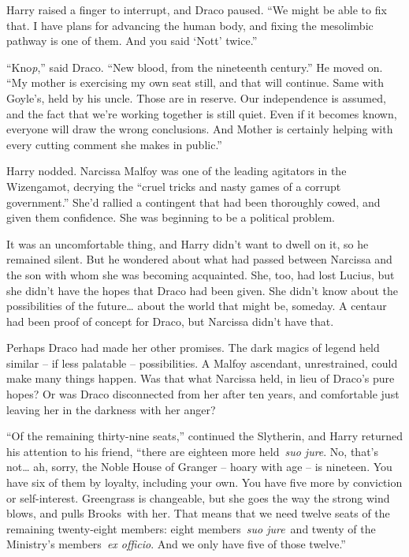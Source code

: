 Harry raised a finger to interrupt, and Draco paused. ``We might be able
to fix that. I have plans for advancing the human body, and fixing the
mesolimbic pathway is one of them. And you said `Nott' twice.''

``Kno\emph{p},'' said Draco. ``New blood, from the nineteenth century.''
He moved on. ``My mother is exercising my own seat still, and that will
continue. Same with Goyle's, held by his uncle. Those are in reserve.
Our independence is assumed, and the fact that we're working together is
still quiet. Even if it becomes known, everyone will draw the wrong
conclusions. And Mother is certainly helping with every cutting comment
she makes in public.''

Harry nodded. Narcissa Malfoy was one of the leading agitators in the
Wizengamot, decrying the ``cruel tricks and nasty games of a corrupt
government.'' She'd rallied a contingent that had been thoroughly cowed,
and given them confidence. She was beginning to be a political problem.

It was an uncomfortable thing, and Harry didn't want to dwell on it, so
he remained silent. But he wondered about what had passed between
Narcissa and the son with whom she was becoming acquainted. She, too,
had lost Lucius, but she didn't have the hopes that Draco had been
given. She didn't know about the possibilities of the future\ldots{}
about the world that might be, someday. A centaur had been proof of
concept for Draco, but Narcissa didn't have that.

Perhaps Draco had made her other promises. The dark magics of legend
held similar -- if less palatable -- possibilities. A Malfoy ascendant,
unrestrained, could make many things happen. Was that what Narcissa
held, in lieu of Draco's pure hopes? Or was Draco disconnected from her
after ten years, and comfortable just leaving her in the darkness with
her anger?

``Of the remaining thirty-nine seats,'' continued the Slytherin, and
Harry returned his attention to his friend, ``there are eighteen more
held~\emph{suo jure}. No, that's not\ldots{} ah, sorry, the Noble House
of Granger -- hoary with age -- is nineteen. You have six of them by
loyalty, including your own. You have five more by conviction or
self-interest. Greengrass is changeable, but she goes the way the strong
wind blows, and pulls Brooks~with her. That means that we need twelve
seats of the remaining twenty-eight members: eight members~\emph{suo
jure}~and twenty of the Ministry's members~\emph{ex officio}. And we
only have five of those twelve.''

